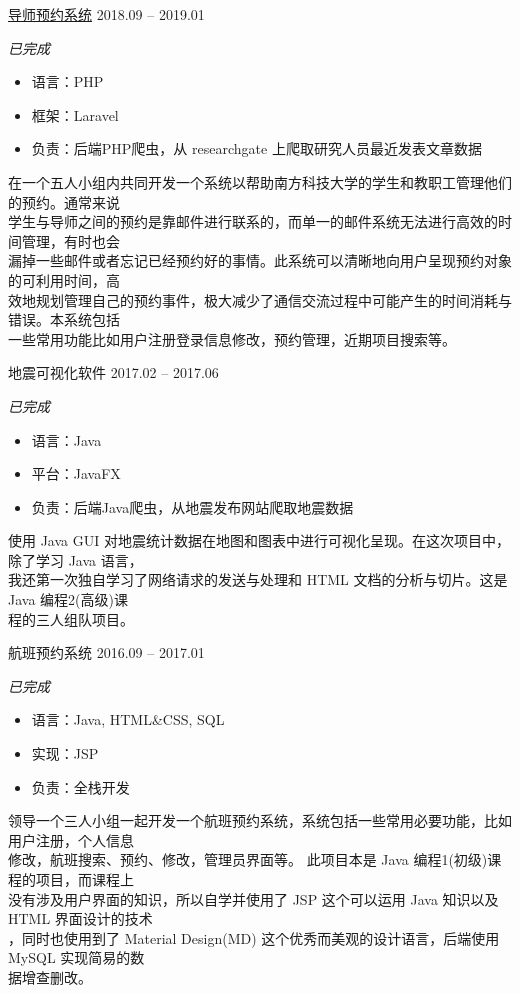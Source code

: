 \documentclass[hidelinks__VERSION__]{adamyi-cv}
\begin{document}
\begin{entrylist}

\entry
{\href{https://github.com/zhaoweizhong/Faculty-Reservation}{\heir 导师预约系统}}
{2018.09 -- 2019.01}
{\emph{\hei 已完成}
\begin{itemize}
    \item \hei 语言：PHP
    \item \hei 框架：Laravel
    \item \hei 负责：后端PHP爬虫，从 researchgate 上爬取研究人员最近发表文章数据
\end{itemize}
{\hei 在一个五人小组内共同开发一个系统以帮助南方科技大学的学生和教职工管理他们的预约。通常来说\\学生与导师之间的预约是靠邮件进行联系的，而单一的邮件系统无法进行高效的时间管理，有时也会\\漏掉一些邮件或者忘记已经预约好的事情。此系统可以清晰地向用户呈现预约对象的可利用时间，高\\效地规划管理自己的预约事件，极大减少了通信交流过程中可能产生的时间消耗与错误。本系统包括\\一些常用功能比如用户注册登录信息修改，预约管理，近期项目搜索等。
}}



\entry
{\heir 地震可视化软件}
{2017.02 -- 2017.06}
{\emph{\hei 已完成}
\begin{itemize}
    \item \hei 语言：Java
    \item \hei 平台：JavaFX
    \item \hei 负责：后端Java爬虫，从地震发布网站爬取地震数据
\end{itemize}
{\hei 使用 Java GUI 对地震统计数据在地图和图表中进行可视化呈现。在这次项目中，除了学习 Java 语言，\\我还第一次独自学习了网络请求的发送与处理和 HTML 文档的分析与切片。这是 Java 编程2(高级)课\\程的三人组队项目。
}}


\entry
{\heir 航班预约系统}
{2016.09 -- 2017.01}
{\emph{\hei 已完成}
\begin{itemize}
    \item \hei 语言：Java, HTML\&CSS, SQL
    \item \hei 实现：JSP
    \item \hei 负责：全栈开发
\end{itemize}
{\hei 领导一个三人小组一起开发一个航班预约系统，系统包括一些常用必要功能，比如用户注册，个人信息\\修改，航班搜索、预约、修改，管理员界面等。 此项目本是 Java 编程1(初级)课程的项目，而课程上\\没有涉及用户界面的知识，所以自学并使用了 JSP 这个可以运用 Java 知识以及 HTML 界面设计的技术\\，同时也使用到了 Material Design(MD) 这个优秀而美观的设计语言，后端使用 MySQL 实现简易的数\\据增查删改。
}}


\end{entrylist}
\end{document}
